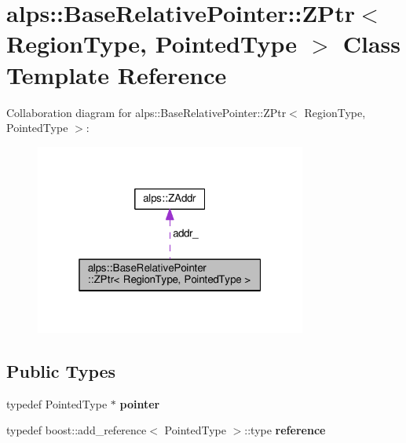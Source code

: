 \hypertarget{classalps_1_1BaseRelativePointer_1_1ZPtr}{}\section{alps\+:\+:Base\+Relative\+Pointer\+:\+:Z\+Ptr$<$ Region\+Type, Pointed\+Type $>$ Class Template Reference}
\label{classalps_1_1BaseRelativePointer_1_1ZPtr}


Collaboration diagram for alps\+:\+:Base\+Relative\+Pointer\+:\+:Z\+Ptr$<$ Region\+Type, Pointed\+Type $>$\+:
\nopagebreak
\begin{figure}[H]
\begin{center}
\leavevmode
\includegraphics[width=253pt]{classalps_1_1BaseRelativePointer_1_1ZPtr__coll__graph}
\end{center}
\end{figure}
\subsection*{Public Types}
\begin{DoxyCompactItemize}
\item 
typedef Pointed\+Type $\ast$ {\bfseries pointer}\hypertarget{classalps_1_1BaseRelativePointer_1_1ZPtr_abf43f5fd49f1c4bc0e4a11d46d60a5f7}{}\label{classalps_1_1BaseRelativePointer_1_1ZPtr_abf43f5fd49f1c4bc0e4a11d46d60a5f7}

\item 
typedef boost\+::add\+\_\+reference$<$ Pointed\+Type $>$\+::type {\bfseries reference}\hypertarget{classalps_1_1BaseRelativePointer_1_1ZPtr_ab66ca9ef28e93077f43b7ba0ee7a5b48}{}\label{classalps_1_1BaseRelativePointer_1_1ZPtr_ab66ca9ef28e93077f43b7ba0ee7a5b48}

\end{DoxyCompactItemize}
